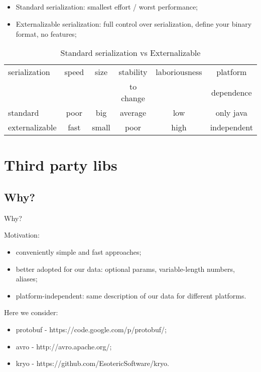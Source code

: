 \documentclass[8pt]{beamer}
\begin{document}
\subsection{\partname}
  \begin{frame}{\partname}
  \begin{itemize}
    \item Standard serialization: smallest effort / worst performance;
    \item Externalizable serialization: full control over serialization, define your binary format, no features;
  \end{itemize}
  \begin{table}
  \begin{tabular}{l | c | c | c | c | c }
    serialization  & speed & size & stability & laboriousness & platform \\
                   &       &      & to change &               & dependence\\
    \hline \hline
    standard       & poor & big   & average & low  & only java  \\
    \hline
    externalizable & fast & small & poor    & high & independent
  \end{tabular}

  \caption{Standard serialization vs Externalizable}
  \end{table}

\end{frame}

\section{Third party libs}
\renewcommand{\partname}{Why?}
\subsection{\partname}
\begin{frame}{\partname}

Motivation:
\begin{itemize}
\item conveniently simple and fast approaches;
\item better adopted for our data: optional params, variable-length numbers, aliases;
\item platform-independent: same description of our data for different platforms.
\end{itemize}

Here we consider:
\begin{itemize}
\item protobuf - https://code.google.com/p/protobuf/;
\item avro - http://avro.apache.org/;
\item kryo - https://github.com/EsotericSoftware/kryo.
\end{itemize}
\end{frame}
\end{document}
